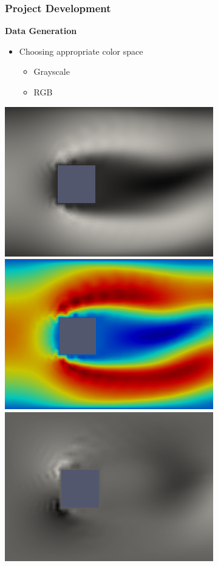 \documentclass[18pt]{beamer}
\begin{document}
\begin{frame}[t]
  \frametitle{Project Development}
  \large{\textbf{Data Generation}}
  \begin{itemize}
  \item Choosing appropriate color space
    \begin{itemize}
    \item Grayscale
    \item RGB
    \end{itemize}
  \end{itemize}  
  \begin{center}
    \includegraphics[scale=0.27]{images/x-direction-gray} \hspace{0.7cm}
    \includegraphics[scale=0.27]{images/x-direction-rgb} \\ \vspace{0.2cm}
    \includegraphics[scale=0.27]{images/y-direction-gray} \hspace{0.7cm}

\end{center}
\end{frame}
\end{document}
